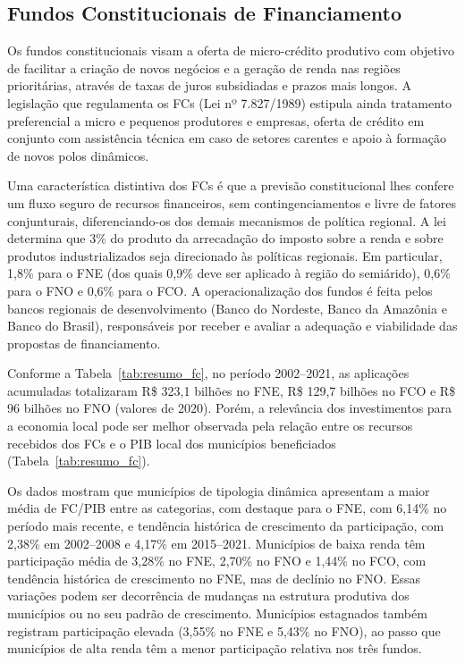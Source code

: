 \subsection{Fundos Constitucionais de Financiamento}
\label{subsec:fcs}

Os fundos constitucionais visam a oferta de micro-crédito produtivo com objetivo de facilitar a criação de novos negócios e a geração de renda nas regiões prioritárias, através de taxas de juros subsidiadas e prazos mais longos. A legislação que regulamenta os FCs (Lei nº 7.827/1989) estipula ainda tratamento preferencial a micro e pequenos produtores e empresas, oferta de crédito em conjunto com assistência técnica em caso de setores carentes e apoio à formação de novos polos dinâmicos. 

Uma característica distintiva dos FCs é que a previsão constitucional lhes confere um fluxo seguro de recursos financeiros, sem contingenciamentos e livre de fatores conjunturais, diferenciando-os dos demais mecanismos de política regional. A lei determina que 3\% do produto da arrecadação do imposto sobre a renda e sobre produtos industrializados seja direcionado às políticas regionais. Em particular, 1,8\% para o FNE (dos quais 0,9\% deve ser aplicado à região do semiárido), 0,6\% para o FNO e 0,6\% para o FCO. A operacionalização dos fundos é feita pelos bancos regionais de desenvolvimento (Banco do Nordeste, Banco da Amazônia e Banco do Brasil), responsáveis por receber e avaliar a adequação e viabilidade das propostas de financiamento.



Conforme a Tabela~\ref{tab:resumo_fc}, no período 2002--2021, as aplicações acumuladas totalizaram R\$ 323,1 bilhões no FNE, R\$ 129,7 bilhões no FCO e R\$ 96 bilhões no FNO (valores de 2020). Porém, a relevância dos investimentos para a economia local pode ser melhor observada pela relação entre os recursos recebidos dos FCs e o PIB local dos municípios beneficiados (Tabela~\ref{tab:resumo_fc}).

Os dados mostram que municípios de tipologia dinâmica apresentam a maior média de FC/PIB entre as categorias, com destaque para o FNE, com 6,14\% no período mais recente, e  tendência histórica de crescimento da participação, com 2,38\% em 2002--2008 e 4,17\% em 2015--2021. Municípios de baixa renda têm participação média de 3,28\% no FNE, 2,70\% no FNO e 1,44\% no FCO, com tendência histórica de crescimento no FNE, mas de declínio no FNO. Essas variações podem ser decorrência de mudanças na estrutura produtiva dos municípios ou no seu padrão de crescimento. Municípios estagnados também registram participação elevada (3,55\% no FNE e 5,43\% no FNO), ao passo que municípios de alta renda têm a menor participação relativa nos três fundos.

